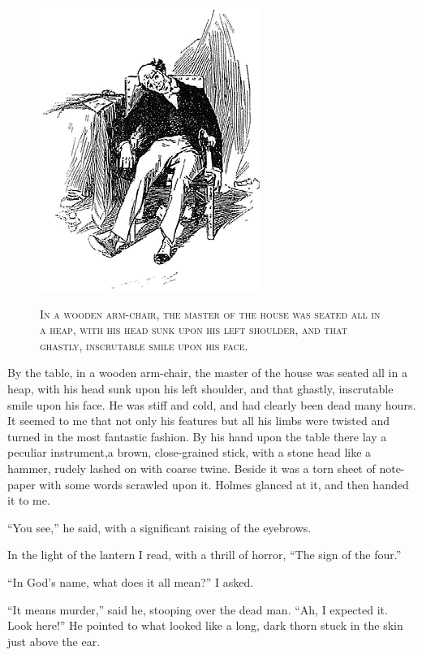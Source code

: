 \documentclass[12pt,english,oneside]{book}
\newcommand{\noun}[1]{\textsc{#1}}
\begin{document}
%
\begin{figure}[htbp]
\noindent \begin{center}\includegraphics{images/sign410-sign-07.png}\end{center}

\noindent \begin{center}\noun{In a wooden arm-chair, the master
of the house was seated all in a heap, with his head sunk upon his
left shoulder, and that ghastly, inscrutable smile upon his face.}\end{center}
\end{figure}
By the table, in a wooden arm-chair, the master of the house was seated
all in a heap, with his head sunk upon his left shoulder, and that
ghastly, inscrutable smile upon his face. He was stiff and cold, and
had clearly been dead many hours. It seemed to me that not only his
features but all his limbs were twisted and turned in the most fantastic
fashion. By his hand upon the table there lay a peculiar instrument,\mdsh{---}a
brown, close-grained stick, with a stone head like a hammer, rudely
lashed on with coarse twine. Beside it was a torn sheet of note-paper
with some words scrawled upon it. Holmes glanced at it, and then handed
it to me.

{}``You see,'' he said, with a significant raising of the eyebrows.

In the light of the lantern I read, with a thrill of horror, {}``The
sign of the four.''

{}``In God's name, what does it all mean?'' I asked.

{}``It means murder,'' said he, stooping over the dead man. {}``Ah,
I expected it. Look here!'' He pointed to what looked like a long,
dark thorn stuck in the skin just above the ear.
\end{document}

